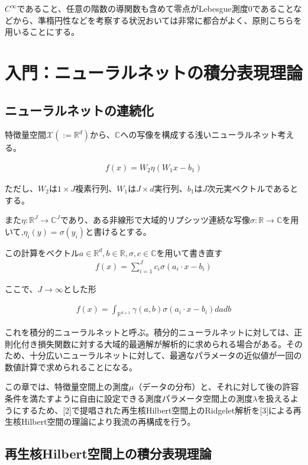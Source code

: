 \documentclass{jsarticle}
\begin{document}
$C^\infty$であること、任意の階数の導関数も含めて零点がLebesgue測度0であることなどから、準楕円性などを考察する状況おいては非常に都合がよく、原則こちらを用いることにする。

\newpage
\section{入門：ニューラルネットの積分表現理論}

\subsection{ニューラルネットの連続化}

特徴量空間$\mathcal{X}(:=\mathbb{R}^d)$から、$\mathbb{C}$への写像を構成する浅いニューラルネット考える。

\begin{align}
f(x)=W_2\eta(W_1x-b_1)
\end{align}


ただし、$W_2$は$1\times J$複素行列、$W_1$は$J\times d$実行列、$b_1$は$J$次元実ベクトルであるとする。

また$\eta:\mathbb{R}^J\to\mathbb{C}^J$であり、ある非線形で大域的リプシッツ連続な写像$\sigma:\mathbb{R}\to\mathbb{C}$を用いて,$\eta_i(y)=\sigma(y_i)$と書けるとする。


この計算をベクトル$a\in\mathbb{R}^d,b\in\mathbb{R},\sigma,c\in\mathbb{C}$を用いて書き直す
\begin{align}
f(x)=\sum^J_{i=1}c_i\sigma(a_i\cdot x-b_i)
\end{align}

ここで、$J\to\infty$とした形

\begin{align}
f(x)=\int_{\mathbb{R}^{d+1}}\gamma(a,b)\sigma(a_i\cdot x-b_i)dadb
\end{align}

これを積分的ニューラルネットと呼ぶ。積分的ニューラルネットに対しては、正則化付き損失関数に対する大域的最適解が解析的に求められる場合がある。そのため、十分広いニューラルネットに対して、最適なパラメータの近似値が一回の数値計算で求められることになる。



この章では、特徴量空間上の測度$\mu$（データの分布）と、それに対して後の許容条件を満たすように自由に設定できる測度パラメータ空間上の測度$\lambda$を扱えるようにするため、[2]で提唱された再生核Hilbert空間上のRidgelet解析を[3]による再生核Hilbert空間の理論により我流の再構成を行う。

\subsection{再生核Hilbert空間上の積分表現理論}
\end{document}
